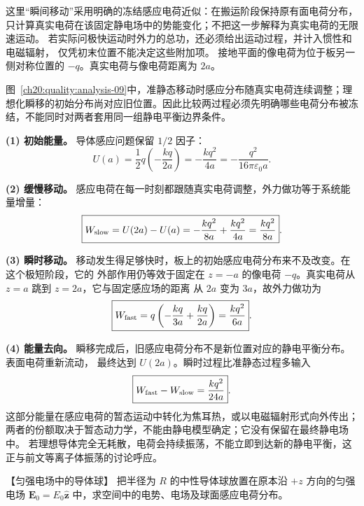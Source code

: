 {\begin{xesolution}
这里“瞬间移动”采用明确的冻结感应电荷近似：在搬运阶段保持原有面电荷分布，
只计算真实电荷在该固定静电场中的势能变化；不把这一步解释为真实电荷的无限速运动。
若实际问极快运动时外力的总功，还必须给出运动过程，并计入惯性和电磁辐射，
仅凭初末位置不能决定这些附加项。
接地平面的像电荷为位于板另一侧对称位置的 $-q$。真实电荷与像电荷距离为 $2a$。

\begin{qualityfigure}
\planeEnergyFigure
{}\label{ch20:quality:analysis-09}
\end{qualityfigure}
图~\ref{ch20:quality:analysis-09}中，准静态移动时感应分布随真实电荷连续调整；理想化瞬移的初始分布尚对应旧位置。因此比较两过程必须先明确哪些电荷分布被冻结，不能同时对两者套用同一组静电平衡边界条件。

\textbf{(1) 初始能量。} 导体感应问题保留 $1/2$ 因子：
\[
  \boxed{U(a)=\frac12q\left(-\frac{kq}{2a}\right)
  =-\frac{kq^2}{4a}=-\frac{q^2}{16\pi\varepsilon_0a}}.
\]

\textbf{(2) 缓慢移动。} 感应电荷在每一时刻都跟随真实电荷调整，外力做功等于系统能量增量：
\[
  \boxed{W_{\rm slow}=U(2a)-U(a)
  =-\frac{kq^2}{8a}+\frac{kq^2}{4a}
  =\frac{kq^2}{8a}}.
\]

\textbf{(3) 瞬时移动。} 移动发生得足够快时，板上的初始感应电荷分布来不及改变。在这个极短阶段，它的
外部作用仍等效于固定在 $z=-a$ 的像电荷 $-q$。真实电荷从 $z=a$ 跳到 $z=2a$，它与固定感应场的距离
从 $2a$ 变为 $3a$，故外力做功为
\[
  \boxed{W_{\rm fast}=q\left(-\frac{kq}{3a}+\frac{kq}{2a}\right)
  =\frac{kq^2}{6a}}.
\]

\textbf{(4) 能量去向。} 瞬移完成后，旧感应电荷分布不是新位置对应的静电平衡分布。表面电荷重新流动，
最终达到 $U(2a)$。瞬时过程比准静态过程多输入
\[
  \boxed{W_{\rm fast}-W_{\rm slow}=\frac{kq^2}{24a}}.
\]
这部分能量在感应电荷的暂态运动中转化为焦耳热，或以电磁辐射形式向外传出；两者的份额取决于暂态动力学，不能由静电模型确定；它没有保留在最终静电场中。
若理想导体完全无耗散，电荷会持续振荡，不能立即到达新的静电平衡，这正与前文等离子体振荡的讨论呼应。
\end{xesolution}



\begin{origexamplebox}{【匀强电场中的导体球】}\label{ch20:ex:s34-3-10}
把半径为 $R$ 的中性导体球放置在原本沿 $+z$ 方向的匀强电场
$\boldsymbol E_0=E_0\hat{\boldsymbol z}$ 中，求空间中的电势、电场及球面感应电荷分布。

\ThQConductingSphere
\end{origexamplebox}\par\nopagebreak[4]

}
